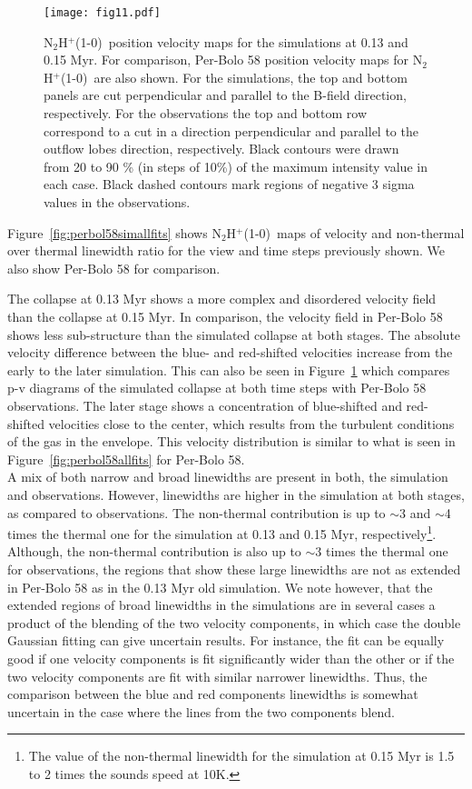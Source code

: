\documentclass[iop]{emulateapj}
\newcommand{\nthp}{\mbox{\rm N$_2$H$^+$(1-0)}}
\begin{document}
\begin{figure}
\center
\texttt{[image: fig11.pdf]}
\caption{\nthp\ position velocity maps for the simulations at 0.13 and 0.15 Myr. For comparison, Per-Bolo 58 position velocity maps for \nthp\ are also shown. For the simulations, the top and bottom panels are cut perpendicular and parallel to the B-field direction, respectively. For the observations the top and bottom row correspond to a cut in a direction perpendicular and parallel to the outflow lobes direction, respectively. Black contours were drawn from 20 to 90 \% (in steps of 10\%) of the maximum intensity value in each case. Black dashed contours mark regions of negative 3 sigma values in the observations.
\label{fig:sim_pvmap}}
\end{figure}

Figure~\ref{fig:perbol58simallfits} shows \nthp\ maps of velocity and non-thermal over thermal linewidth ratio for the view and time steps previously shown. We also show Per-Bolo 58 for comparison.

The collapse at 0.13 Myr shows a more complex and disordered velocity field than the collapse at 0.15 Myr. In comparison, the velocity field in Per-Bolo 58 shows less sub-structure than the simulated collapse at both stages. The absolute velocity difference between the blue- and red-shifted velocities increase from the early to the later simulation. This can also be seen in Figure~\ref{fig:sim_pvmap} which compares p-v diagrams of the simulated collapse at both time steps with Per-Bolo 58 observations. The later stage shows a concentration of blue-shifted and red-shifted velocities close to the center, which results from the turbulent conditions of the gas in the envelope. This velocity distribution is similar to what is seen in Figure~\ref{fig:perbol58allfits} for Per-Bolo 58. \\




A mix of both narrow and broad linewidths are present in both, the simulation and observations. However, linewidths are higher in the simulation at both stages, as compared to observations. The non-thermal contribution is up to $\sim$3 and $\sim$4 times the thermal one for the simulation at 0.13 and 0.15 Myr, respectively\footnote{The value of the non-thermal linewidth for the simulation at 0.15 Myr is 1.5 to 2 times the sounds speed at 10K.}. Although, the non-thermal contribution is also up to $\sim3$ times the thermal one for observations, the regions that show these large linewidths are not as extended in Per-Bolo 58 as in the 0.13 Myr old simulation. We note however, that the extended regions of broad linewidths in the simulations are in several cases a product of the blending of the two velocity components, in which case the double Gaussian fitting can give uncertain results. For instance, the fit can be equally good if one velocity components is fit significantly wider than the other or if the two velocity components are fit with similar narrower linewidths. Thus, the comparison between the blue and red components linewidths is somewhat uncertain in the case where the lines from the two components blend.
\end{document}
